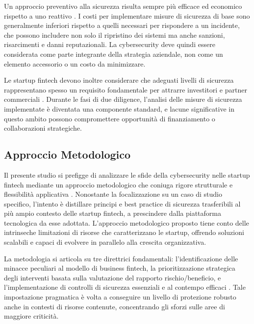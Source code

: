 Un approccio preventivo alla sicurezza risulta sempre più efficace ed economico rispetto a uno reattivo \cite{fintechChallenges}. I costi per implementare misure di sicurezza di base sono generalmente inferiori rispetto a quelli necessari per rispondere a un incidente, che possono includere non solo il ripristino dei sistemi ma anche sanzioni, risarcimenti e danni reputazionali. La cybersecurity deve quindi essere considerata come parte integrante della strategia aziendale, non come un elemento accessorio o un costo da minimizzare.

Le startup fintech devono inoltre considerare che adeguati livelli di sicurezza rappresentano spesso un requisito fondamentale per attrarre investitori e partner commerciali \cite{fintechChallenges}. Durante le fasi di due diligence, l'analisi delle misure di sicurezza implementate è diventata una componente standard, e lacune significative in questo ambito possono compromettere opportunità di finanziamento o collaborazioni strategiche.

\subsection{Approccio Metodologico}

Il presente studio si prefigge di analizzare le sfide della cybersecurity nelle startup fintech mediante un approccio metodologico che coniuga rigore strutturale e flessibilità applicativa \cite{fintechChallenges}. Nonostante la focalizzazione su un caso di studio specifico, l'intento è distillare principi e best practice di sicurezza trasferibili al più ampio contesto delle startup fintech, a prescindere dalla piattaforma tecnologica da esse adottata. L'approccio metodologico proposto tiene conto delle intrinseche limitazioni di risorse che caratterizzano le startup, offrendo soluzioni scalabili e capaci di evolvere in parallelo alla crescita organizzativa.

La metodologia si articola su tre direttrici fondamentali: l'identificazione delle minacce peculiari al modello di business fintech, la prioritizzazione strategica degli interventi basata sulla valutazione del rapporto rischio/beneficio, e l'implementazione di controlli di sicurezza essenziali e al contempo efficaci \cite{fintechChallenges}. Tale impostazione pragmatica è volta a conseguire un livello di protezione robusto anche in contesti di risorse contenute, concentrando gli sforzi sulle aree di maggiore criticità.



